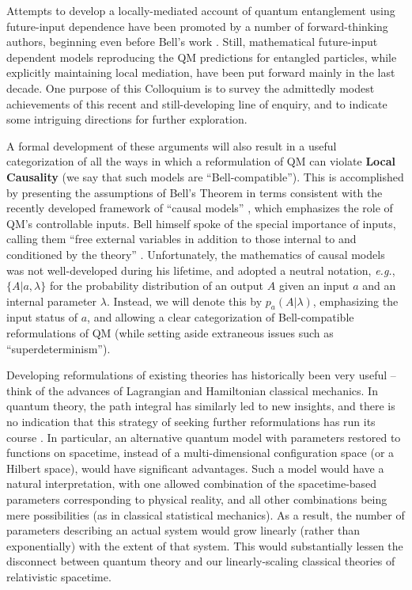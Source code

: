 \documentclass[rmp, aps, preprint, longbibliography]{revtex4-1}
\begin{document}
Attempts to develop a locally-mediated account of quantum entanglement using future-input dependence have been promoted by a number of forward-thinking authors, beginning even before Bell's work \cite{costa1953,costa1977,costa1979,pegg1982,sutherland1983,price1984}.  Still, mathematical future-input dependent models reproducing the QM predictions for entangled particles, while explicitly maintaining local mediation, have been put forward mainly in the last decade.  One purpose of this Colloquium is to survey the admittedly modest achievements of this recent and still-developing line of enquiry, and to indicate some intriguing directions for further exploration.

A formal development of these arguments will also result in a useful categorization of all the ways in which a reformulation of QM can violate {\bf Local Causality} (we say that such models are ``Bell-compatible'').  This is accomplished by presenting the assumptions of Bell's Theorem in terms consistent with the recently developed framework of ``causal models'' \cite{pearl2009}, which emphasizes the role of QM's controllable inputs.  Bell himself spoke of the special importance of inputs, calling them ``free external variables in addition to those internal to and conditioned by the theory'' \cite{bell1977}.  Unfortunately, the mathematics of causal models was not well-developed during his lifetime, and \textcite{bell1976b,bell1981,bell1990} adopted a neutral notation, \emph{e.g.}, $\{ A | a, \lambda \}$ for the probability distribution of an output $A$ given an input $a$ and an internal parameter $\lambda$.  Instead, we will denote this by $p_a(A|\lambda)$, emphasizing the input status of $a$, and allowing a clear categorization of Bell-compatible reformulations of QM (while setting aside extraneous issues such as ``superdeterminism'').

Developing reformulations of existing theories has historically been very useful -- think of the advances of Lagrangian and Hamiltonian classical mechanics.  In quantum theory, the path integral has similarly led to new insights, and there is no indication that this strategy of seeking further reformulations has run its course \cite{feynman1964}.  In particular, an alternative quantum model with parameters restored to functions on spacetime, instead of a multi-dimensional configuration space (or a Hilbert space), would have significant advantages.  Such a model would have a natural interpretation, with one allowed combination of the spacetime-based parameters corresponding to physical reality, and all other combinations being mere possibilities (as in classical statistical mechanics).  As a result, the number of parameters describing an actual system would grow linearly (rather than exponentially) with the extent of that system.  This would substantially lessen the disconnect between quantum theory and our linearly-scaling classical theories of relativistic spacetime.
\end{document}
